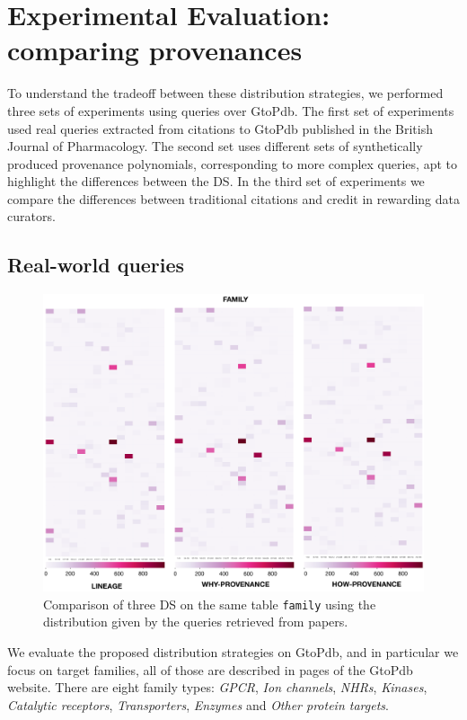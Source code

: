 \section{Experimental Evaluation: comparing provenances}
\label{sec:experiments}
To understand the tradeoff between these distribution strategies, we performed three sets of experiments using queries over GtoPdb.  The first set of experiments used real queries extracted from citations to GtoPdb published in the British Journal of Pharmacology.  
The second set uses different sets of synthetically produced provenance polynomials, corresponding to more complex queries, apt to highlight the differences between the DS.
In the third set of experiments we compare the differences between traditional citations and credit in rewarding data curators. 

\subsection{Real-world queries}
\label{sec:real_world_queries}

\begin{figure}[t]
  \includegraphics[width=1\textwidth]{figures/paper_based}
  \caption{Comparison of three DS on the same table \texttt{family} using the distribution given by the queries retrieved from papers.}
  \label{figure:comparison_on_papers}
\end{figure}


We evaluate the proposed distribution strategies on GtoPdb, and in particular we focus on target families, all of those are described in pages of the GtoPdb website. 
There are eight family types: \emph{GPCR}, \emph{Ion channels}, \emph{NHRs}, \emph{Kinases}, \emph{Catalytic receptors}, \emph{Transporters}, \emph{Enzymes} and \emph{Other protein targets}.  

